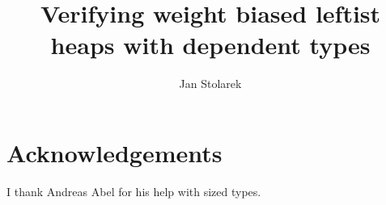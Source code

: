 \documentclass{llncs}
\begin{document}
\title{Verifying weight biased leftist heaps with dependent types}
\author{Jan Stolarek}



\maketitle







\section*{Acknowledgements}

I thank Andreas Abel for his help with sized types.


\end{document}
